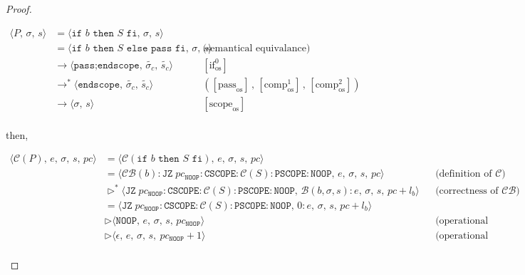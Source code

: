 \documentclass{article}
\begin{document}
\begin{proof}
\begin{itemize}
\begin{itemize}
                \[
                  \begin{aligned}
                  \langle P,\, \sigma,\, s \rangle
                  &=\langle \texttt{if } b \texttt{ then } S \texttt{ fi},\, \sigma,\, s \rangle \\
                  &=\langle \texttt{if } b \texttt{ then } S \texttt{ else pass fi},\, \sigma,\, s \rangle 
                  && \text{(semantical equivalance)}\\
                  &\rightarrow \langle \texttt{pass;endscope},\, \tilde{\sigma_c} ,\, \tilde{s_c} \rangle
                  && [\text{if}^0_{\text{os}}]   \\
                  &\rightarrow^\ast \langle \texttt{endscope},\, \tilde{\sigma_c} ,\, \tilde{s_c} \rangle 
                  && ([\text{pass}_{\text{os}}] \,,\, [\text{comp}^1_{\text{os}}] \,,\, [\text{comp}^2_{\text{os}}])   \\
                  &\rightarrow \langle \sigma ,\, s \rangle
                  && [\text{scope}_{\text{os}}]   \\
                  \end{aligned}
              \]

            then,

            \[
              \begin{aligned}
              \langle \mathcal{C}(P),\, e,\, \sigma,\, s,\, pc \rangle
              &= \langle \mathcal{C}(\texttt{if } b \texttt{ then } S \texttt{ fi}),\, e,\, \sigma,\, s,\, pc \rangle \\
              &= \langle \mathcal{CB}(b) : \texttt{JZ}\; pc_{\texttt{NOOP}} : \texttt{CSCOPE} : \mathcal{C}(S) : \texttt{PSCOPE} :\texttt{NOOP} ,\, e,\, \sigma,\, s,\, pc \rangle
              && \text{(definition of $\mathcal{C}$)} \\   
              &\triangleright^\ast \langle \texttt{JZ}\; pc_{\texttt{NOOP}} : \texttt{CSCOPE} : \mathcal{C}(S) : \texttt{PSCOPE} :\texttt{NOOP} ,\, \mathcal{B}(b, \sigma, s) : e,\, \sigma,\, s,\, pc + l_b \rangle
              && \text{(correctness of $\mathcal{CB}$)} \\ 
              &= \langle \texttt{JZ}\; pc_{\texttt{NOOP}} : \texttt{CSCOPE} : \mathcal{C}(S) : \texttt{PSCOPE} :\texttt{NOOP} ,\, 0 : e,\, \sigma,\, s,\, pc + l_b \rangle \\  
              &\triangleright \langle \texttt{NOOP} ,\, e,\, \sigma,\, s,\, pc_{\texttt{NOOP}} \rangle
              && \text{(operational semantics)} \\
              &\triangleright \langle \epsilon ,\, e,\, \sigma,\, s,\ pc_{\texttt{NOOP}} + 1 \rangle
              && \text{(operational semantics)} \\ 
              \end{aligned}
          \]
                

\end{itemize}
\end{itemize}
\end{proof}
\end{document}
